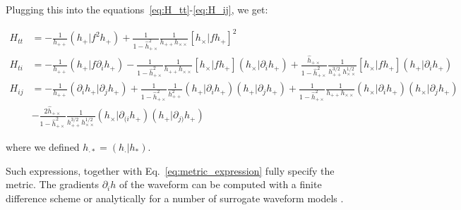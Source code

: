 \documentclass[twocolumn,showpacs,preprintnumbers,nofootinbib,prd,
superscriptaddress,10pt]{revtex4-2}
\newcommand{\rescalar}[2]{( #1 |#2 )}
\newcommand{\imscalar}[2]{[ #1|#2 ]}
\begin{document}
Plugging this into the equations~\eqref{eq:H_tt}-\eqref{eq:H_ij}, we get:
\begin{widetext}
\begin{align}
	H_{tt} &= - \frac{1}{h_{++}} \rescalar{h_+}{f^2 {h_+}}
		+ \frac{1}{1-\hat{h}^2_{+\times}} \frac{1}{h_{++}h_{\times\times}} \imscalar{{h_\times}}{f{h_+}}^2 \label{eq:H_tt_grad} \\
	H_{ti} &= - \frac{1}{h_{++}} \rescalar{h_+}{f \partial_i h_+}
		- \frac{1}{1-\hat{h}^2_{+\times}} \frac{1}{h_{++}h_{\times\times}} \imscalar{{h_\times}}{f{h_+}} \rescalar{{h_\times}}{\partial_i h_+}
		+ \frac{\hat{h}_{+\times}}{1-\hat{h}^2_{+\times}} \frac{1}{h^{3/2}_{++}h^{1/2}_{\times\times}}
			\imscalar{{h_\times}}{f{h_+}} \rescalar{{h_+}}{\partial_i h_+} \label{eq:H_ti_grad}\\
	H_{ij} &= - \frac{1}{h_{++}} \rescalar{\partial_i h_+}{\partial_j h_+}
		+ \frac{1}{1-\hat{h}^2_{+\times}} \frac{1}{h^2_{++}} \rescalar{h_+}{\partial_i {h_+}} \rescalar{{h_+}}{\partial_j {h_+}}
		+ \frac{1}{1-\hat{h}^2_{+\times}} \frac{1}{h_{++}h_{\times\times}} \rescalar{h_\times}{\partial_i {h_+}} \rescalar{{h_\times}}{\partial_j {h_+}} \nonumber \\
		& - \frac{2 \hat{h}_{+\times}}{1-\hat{h}^2_{+\times}} \frac{1}{h^{3/2}_{++}h^{1/2}_{\times\times}}
		\rescalar{h_\times}{\partial_{(i} {h_+}} \rescalar{{h_+}}{\partial_{j)} {h_+}} \label{eq:H_ij_grad}
%
%
%
\end{align}
\end{widetext}
where we defined $h_{\cdot*} = \rescalar{h_\cdot}{h_*}$.

Such expressions, together with Eq.~\eqref{eq:metric_expression} fully specify the metric.
The gradients $\partial_i h$ of the waveform can be computed with a finite difference scheme or analytically for a number of surrogate waveform models \cite{Khan:2020fso, Schmidt:2020yuu, Thomas:2022rmc, Tissino:2022thn}.
\end{document}
